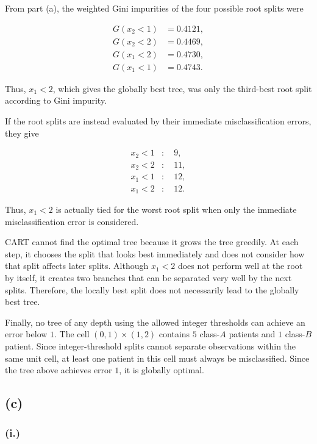 \documentclass{article}
\begin{document}
\newpage
From part (a), the weighted Gini impurities of the four possible root splits were

$$
\begin{aligned}
G(x_2<1)&=0.4121,\\
G(x_2<2)&=0.4469,\\
G(x_1<2)&=0.4730,\\
G(x_1<1)&=0.4743.
\end{aligned}
$$

Thus, $x_1<2$, which gives the globally best tree, was only the third-best root split according to Gini impurity.

If the root splits are instead evaluated by their immediate misclassification errors, they give

$$
\begin{aligned}
x_2<1 &: \quad 9,\\
x_2<2 &: \quad 11,\\
x_1<1 &: \quad 12,\\
x_1<2 &: \quad 12.
\end{aligned}
$$

Thus, $x_1<2$ is actually tied for the worst root split when only the immediate misclassification error is considered.

CART cannot find the optimal tree because it grows the tree greedily. At each step, it chooses the split that looks best immediately and does not consider how that split affects later splits. Although $x_1<2$ does not perform well at the root by itself, it creates two branches that can be separated very well by the next splits. Therefore, the locally best split does not necessarily lead to the globally best tree.

Finally, no tree of any depth using the allowed integer thresholds can achieve an error below $1$. The cell
$
\boxed{(0,1)\times(1,2)}
$ contains $5$ class-$A$ patients and $1$ class-$B$ patient. Since integer-threshold splits cannot separate observations within the same unit cell, at least one patient in this cell must always be misclassified. Since the tree above achieves error $1$, it is globally optimal.

\subsection*{(c)}

\subsubsection*{(i.)}
\end{document}
